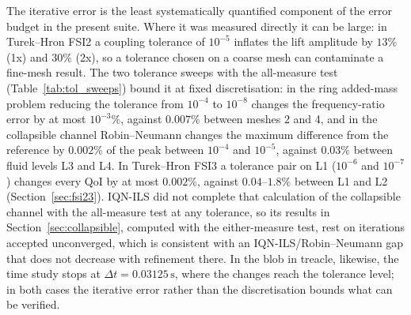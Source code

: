 The iterative error is the least systematically quantified component of the error budget in the present suite.
Where it was measured directly it can be large: in Turek--Hron FSI2 a coupling tolerance of $10^{-5}$ inflates the lift amplitude by $13\%$ (1x) and $30\%$ (2x), so a tolerance chosen on a coarse mesh can contaminate a fine-mesh result.
The two tolerance sweeps with the all-measure test (Table~\ref{tab:tol_sweeps}) bound it at fixed discretisation: in the ring added-mass problem reducing the tolerance from $10^{-4}$ to $10^{-8}$ changes the frequency-ratio error by at most $10^{-3}\%$, against $0.007\%$ between meshes 2 and 4, and in the collapsible channel Robin--Neumann changes the maximum difference from the reference by $0.002\%$ of the peak between $10^{-4}$ and $10^{-5}$, against $0.03\%$ between fluid levels L3 and L4. In Turek--Hron FSI3 a tolerance pair on L1 ($10^{-6}$ and $10^{-7}$) changes every QoI by at most $0.002\%$, against $0.04$--$1.8\%$ between L1 and L2 (Section~\ref{sec:fsi23}).
IQN-ILS did not complete that calculation of the collapsible channel with the all-measure test at any tolerance, so its results in Section~\ref{sec:collapsible}, computed with the either-measure test, rest on iterations accepted unconverged, which is consistent with an IQN-ILS/Robin--Neumann gap that does not decrease with refinement there.
In the blob in treacle, likewise, the time study stops at $\Delta t = 0.03125\,\mathrm{s}$, where the changes reach the tolerance level; in both cases the iterative error rather than the discretisation bounds what can be verified.

